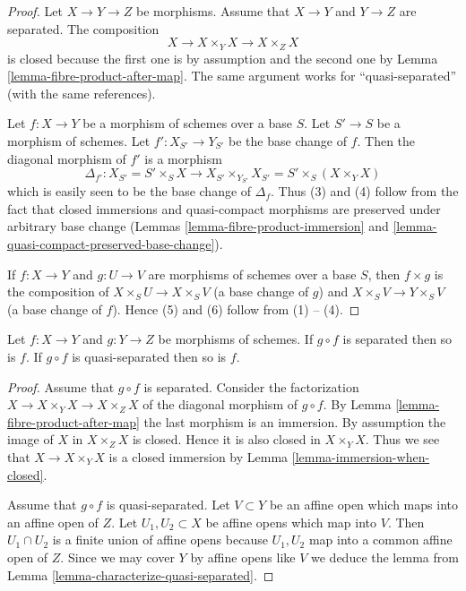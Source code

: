 \begin{proof}
Let $X \to Y \to Z$ be morphisms. Assume that $X \to Y$ and
$Y \to Z$ are separated. The composition
$$
X \to X \times_Y X \to X \times_Z X
$$
is closed because the first one is by assumption and the second
one by Lemma \ref{lemma-fibre-product-after-map}. The same argument
works for ``quasi-separated'' (with the same references).

\medskip\noindent
Let $f : X \to Y$ be a morphism of schemes over a base $S$.
Let $S' \to S$ be a morphism of schemes. Let $f' : X_{S'} \to Y_{S'}$
be the base change of $f$. Then the diagonal morphism
of $f'$ is a morphism
$$
\Delta_{f'} :
X_{S'} = S' \times_S X
\longrightarrow
X_{S'} \times_{Y_{S'}} X_{S'} = S' \times _S (X \times_Y X)
$$
which is easily seen to be the base change of $\Delta_f$.
Thus (3) and (4) follow from the fact that
closed immersions and quasi-compact morphisms are preserved
under arbitrary base change (Lemmas
\ref{lemma-fibre-product-immersion} and
\ref{lemma-quasi-compact-preserved-base-change}).

\medskip\noindent
If $f : X \to Y$ and $g : U \to V$ are morphisms of schemes over a base $S$,
then $f \times g$ is the composition of $X \times_S U \to X \times_S V$
(a base change of $g$) and $X \times_S V \to Y \times_S V$ (a base change
of $f$). Hence (5) and (6) follow from (1) -- (4).
\end{proof}

\begin{lemma}
\label{lemma-compose-after-separated}
Let $f : X \to Y$ and $g : Y \to Z$ be morphisms of schemes.
If $g \circ f$ is separated then so is $f$.
If $g \circ f$ is quasi-separated then so is $f$.
\end{lemma}

\begin{proof}
Assume that $g \circ f$ is separated.
Consider the factorization $X \to X \times_Y X \to X \times_Z X$
of the diagonal morphism of $g \circ f$.
By Lemma \ref{lemma-fibre-product-after-map}
the last morphism is an immersion. By assumption the image
of $X$ in $X \times_Z X$ is closed. Hence it is also closed
in $X \times_Y X$. Thus we see that $X \to X \times_Y X$
is a closed immersion by Lemma \ref{lemma-immersion-when-closed}.

\medskip\noindent
Assume that $g \circ f$ is quasi-separated.
Let $V \subset Y$ be an affine open which maps into an affine
open of $Z$. Let $U_1, U_2 \subset X$ be affine opens which
map into $V$. Then $U_1 \cap U_2$ is a finite union of affine
opens because $U_1, U_2$ map into a common affine open
of $Z$. Since we may cover $Y$ by affine opens like $V$ we
deduce the lemma from Lemma \ref{lemma-characterize-quasi-separated}.
\end{proof}

